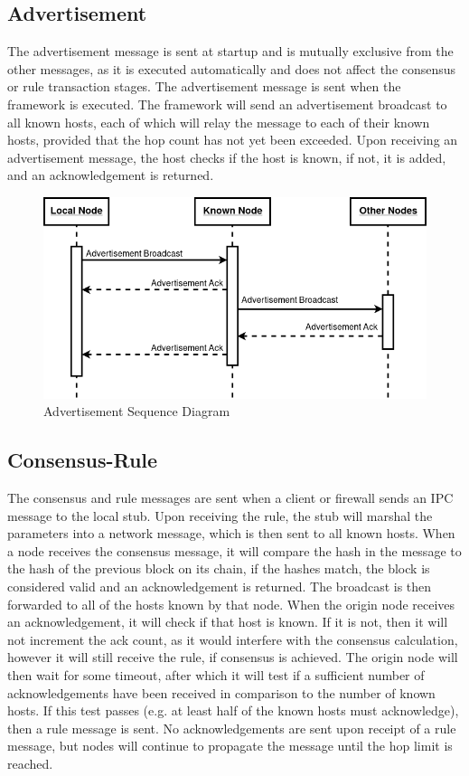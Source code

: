 \documentclass[a4paper, 11pt]{report}
\begin{document}
\subsection{Advertisement}
The advertisement message is sent at startup and is mutually exclusive from the other messages, as it is executed automatically and does not affect the consensus or rule transaction stages. The advertisement message is sent when the framework is executed. The framework will send an advertisement broadcast to all known hosts, each of which will relay the message to each of their known hosts, provided that the hop count has not yet been exceeded. Upon receiving an advertisement message, the host checks if the host is known, if not, it is added, and an acknowledgement is returned.

\begin{figure}[H]
\centering
\includegraphics[width=\textwidth,keepaspectratio]{advertisement_seq}
\caption{Advertisement Sequence Diagram} 
\label{fig:advseq}
\end{figure}

\subsection{Consensus-Rule}
The consensus and rule messages are sent when a client or firewall sends an \acrshort{IPC} message to the local \gls{stub}. Upon receiving the rule, the \gls{stub} will marshal the parameters into a network message, which is then sent to all known hosts. When a node receives the consensus message, it will compare the hash in the message to the hash of the previous block on its chain, if the hashes match, the block is considered valid and an acknowledgement is returned. The broadcast is then forwarded to all of the hosts known by that node. When the origin node receives an acknowledgement, it will check if that host is known. If it is not, then it will not increment the ack count, as it would interfere with the consensus calculation, however it will still receive the rule, if consensus is achieved. The origin node will then wait for some timeout, after which it will test if a sufficient number of acknowledgements have been received in comparison to the number of known hosts. If this test passes (e.g. at least half of the known hosts must acknowledge), then a rule message is sent. No acknowledgements are sent upon receipt of a rule message, but nodes will continue to propagate the message until the hop limit is reached.
\end{document}

